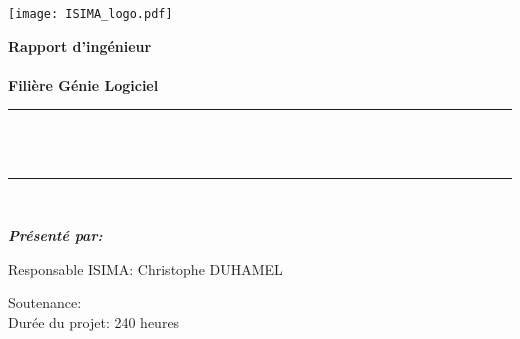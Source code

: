 \makeatletter
\begin{titlepage}
  \newcommand{\HRule}{\rule{\linewidth}{0.5mm}}
  \center
  \texttt{[image: ISIMA\_logo.pdf]}
  \vspace{.5cm}



  {\bfseries\Large Rapport d'ingénieur\\[.3cm]
  \sujetLong \\[.5cm]
  \large Filière Génie Logiciel\\[.5cm]}
  \HRule \\[0.3cm]
  { \LARGE \bfseries \@title}\\ %
  \HRule \\[0.5cm]

  

  \begin{flushleft} \Large \bfseries
    \emph{Présenté par:} \@author\\[1cm]
  \end{flushleft}
  \begin{minipage}[t]{0.52\textwidth}
    \begin{flushleft} \large
      Responsable ISIMA: Christophe DUHAMEL%
    \end{flushleft}
  \end{minipage}
  \hfill
  \begin{minipage}[t]{0.42\textwidth}
    \begin{flushleft} \large
      Soutenance: \@date\\

      Durée du projet: 240 heures
    \end{flushleft}
  \end{minipage}\\[1cm]


\end{titlepage}

